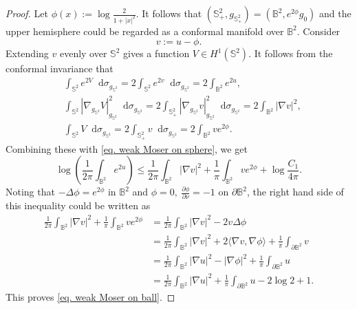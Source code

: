 \documentclass[11pt,a4paper,twoside]{amsart}
\newtheorem{sketch proof}{Sketch of the proof}[section]
\newcommand{\dd}{\mathop{}\!\mathrm{d}}
\begin{document}
\begin{proof}
    Let $\phi(x):=\log\frac{2}{1+|x|^2}$.  It follows that $(\mathbb{S}^2_+,g_{\mathbb{S}^2_+})=(\mathbb{B}^2,e^{2\phi}g_0)$ and the upper hemisphere could be regarded as a conformal manifold over $\mathbb{B}^2$. Consider
    \[
    v:=u-\phi.
    \]
    Extending $v$ evenly over $\mathbb{S}^2$ gives a function $V\in H^1(\mathbb{S}^2)$. It follows from the conformal invariance that
    \begin{align*}
        &\int_{\mathbb{S}^2}e^{2V}
        \dd \sigma_{g_{\mathbb{S}^2}}
        =2\int_{\mathbb{S}^2}e^{2v}
        \dd \sigma_{g_{\mathbb{S}^2}}
        =2\int_{\mathbb{B}^2}e^{2u}
        ,\\[2mm]
        &\int_{\mathbb{S}^2}
        |\nabla_{g_{\mathbb{S}^2}} V|_{g_{\mathbb{S}^2}}^2
        \dd \sigma_{g_{\mathbb{S}^2}}
        =2\int_{\mathbb{S}^2_+}
        |\nabla_{g_{\mathbb{S}^2}} v|_{g_{\mathbb{S}^2}}^2
        \dd \sigma_{g_{\mathbb{S}^2}}
        =2\int_{\mathbb{B}^2}|\nabla v|^2
        ,\\[2mm]
        &\int_{\mathbb{S}^2} V
        \dd \sigma_{g_{\mathbb{S}^2}}
        =2\int_{\mathbb{S}_+^2}v
        \dd \sigma_{g_{\mathbb{S}^2}}
        =2\int_{\mathbb{B}^2}ve^{2\phi}.
    \end{align*}
    Combining these with \cref{eq. weak Moser on sphere}, we get
    \[
    \log\left( \frac{1}{2\pi}\int_{\mathbb{B}^2}e^{2u}
        \right)
        \leq \frac{1}{2\pi}
        \int_{\mathbb{B}^2}
        |\nabla v|^2
        +\frac{1}{\pi}\int_{\mathbb{B}^2}
        ve^{2\phi}
        +\log\frac{C_1}{4\pi}.
    \]
    Noting that $-\Delta\phi=e^{2\phi}$ in $\mathbb{B}^2$ and $\phi=0,\ \frac{\partial\phi}{\partial\nu}=-1$ on $\partial\mathbb{B}^2$, the right hand side of this inequality could be written as
    \begin{align*}
        \frac{1}{2\pi}
        \int_{\mathbb{B}^2}
        |\nabla v|^2
        +\frac{1}{\pi}\int_{\mathbb{B}^2}
        ve^{2\phi}
        &= \frac{1}{2\pi}\int_{\mathbb{B}^2}
        |\nabla v|^2-2v\Delta\phi\\[2mm]
        &= \frac{1}{2\pi}\int_{\mathbb{B}^2}
        |\nabla v|^2+2\langle\nabla v,\nabla\phi\rangle
        +\frac{1}{\pi}
        \int_{\partial\mathbb{B}^2}v\\[2mm]
        &= \frac{1}{2\pi}\int_{\mathbb{B}^2}
        |\nabla u|^2-|\nabla\phi|^2
        +\frac{1}{\pi}
        \int_{\partial\mathbb{B}^2}u\\[2mm]
        &= \frac{1}{2\pi}\int_{\mathbb{B}^2}
        |\nabla u|^2
        +\frac{1}{\pi}
        \int_{\partial\mathbb{B}^2}u
        -2\log 2+1.
    \end{align*}
    This proves \cref{eq. weak Moser on ball}.


\end{proof}
\end{document}
